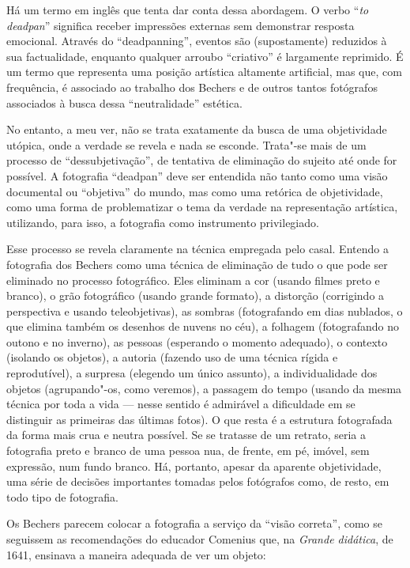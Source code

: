 Há um termo em inglês que tenta dar conta dessa abordagem. O verbo ``\emph{to
deadpan}'' significa receber impressões externas sem demonstrar resposta
emocional. Através do ``deadpanning'', eventos são (supostamente)
reduzidos à sua factualidade, enquanto qualquer arroubo ``criativo'' é
largamente reprimido. É um termo que representa uma posição artística
altamente artificial, mas que, com frequência, é associado ao trabalho
dos Bechers e de outros tantos fotógrafos associados à busca dessa
``neutralidade'' estética.

No entanto, a meu ver, não se trata exatamente da busca de uma objetividade
utópica, onde a verdade se revela e nada se esconde. Trata"-se mais de um
processo de ``dessubjetivação'', de tentativa de eliminação do sujeito
até onde for possível. A fotografia ``deadpan'' deve ser entendida não
tanto como uma visão documental ou ``objetiva'' do mundo, mas como uma
retórica de objetividade, como uma forma de problematizar o tema da
verdade na representação artística, utilizando, para isso, a fotografia
como instrumento privilegiado.

Esse processo se revela claramente na técnica empregada pelo casal.
Entendo a fotografia dos Bechers como uma técnica de eliminação de tudo
o que pode ser eliminado no processo fotográfico. Eles eliminam a cor
(usando filmes preto e branco), o grão fotográfico (usando grande
formato), a distorção (corrigindo a perspectiva e usando teleobjetivas),
as sombras (fotografando em dias nublados, o que elimina também os
desenhos de nuvens no céu), a folhagem (fotografando no outono e no
inverno), as pessoas (esperando o momento adequado), o contexto
(isolando os objetos), a autoria (fazendo uso de uma técnica rígida e
reprodutível), a surpresa (elegendo um único assunto), a individualidade
dos objetos (agrupando"-os, como veremos), a passagem do tempo (usando da
mesma técnica por toda a vida --- nesse sentido é admirável a dificuldade
em se distinguir as primeiras das últimas fotos). O que resta é a
estrutura fotografada da forma mais crua e neutra possível. Se se
tratasse de um retrato, seria a fotografia preto e branco de uma pessoa
nua, de frente, em pé, imóvel, sem expressão, num fundo branco. Há,
portanto, apesar da aparente objetividade, uma série de decisões
importantes tomadas pelos fotógrafos como, de resto, em todo tipo de
fotografia.

Os Bechers parecem colocar a fotografia a serviço da ``visão correta'', 
como se seguissem as recomendações do educador Comenius que, na
\emph{Grande didática}, de 1641, ensinava a maneira adequada de ver um
objeto:

